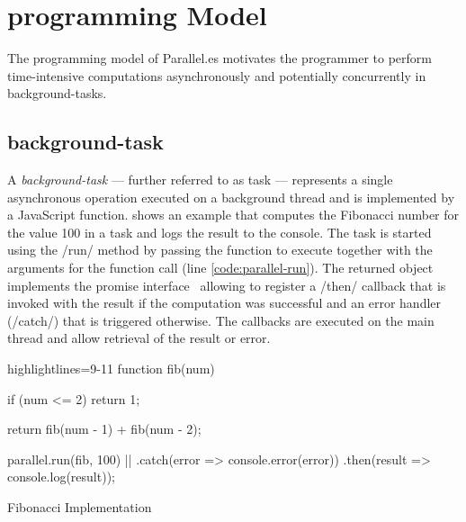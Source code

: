 \section{programming Model}\label{sec:programming-model}
The programming model of Parallel.es motivates the programmer to perform time-intensive computations asynchronously and potentially concurrently in background-tasks. 

\subsection{background-task}
A \textit{background-task} --- further referred to as task --- represents a single asynchronous operation executed on a background thread and is implemented by a JavaScript function.  shows an example that computes the Fibonacci number for the value 100 in a task and logs the result to the console. The task is started using the \javascriptinline/run/ method by passing the function to execute together with the arguments for the function call (line \ref{code:parallel-run}). The returned object implements the promise interface~\cite[Section 18.3.18]{ecmaScript2015} allowing to register a \javascriptinline/then/ callback that is invoked with the result if the computation was successful and an error handler (\javascriptinline/catch/) that is triggered otherwise. The callbacks are executed on the main thread and allow retrieval of the result or error. 


\begin{listing}
	\begin{javascriptcode*}{highlightlines={9-11}}
function fib(num) {
	if (num <= 2) {
    	return 1;
	}

	return fib(num - 1) + fib(num - 2);
}
        
parallel.run(fib, 100) |$\label{code:parallel-run}$|
	.catch(error => console.error(error))
	.then(result => console.log(result));	
	\end{javascriptcode*}

	\caption{Fibonacci Implementation}
	\label{fig:fibonacci-implementation}
\end{listing}

